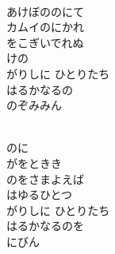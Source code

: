 \documentclass[10pt,b5j]{tarticle} %
\begin{document}
\vspace{1.5em} %
\newcommand{\linespace}{0.5em} %
\newcommand{\blocksize}{0.33\hsize} %
\newcommand{\itemmargin}{3em} %
\begin{enumerate} %
    \setlength{\itemindent}{\itemmargin} %
    \begin{minipage}[c]{\blocksize}
    
        \vspace{\linespace}
        \item~\\
        あけぼののにて\\
        カムイのにかれ\\
        をこぎいでれぬ\\
        けの\\
        がりしに ひとりたち\\
        はるかなるの\\
        のぞみみん
        
        \vspace{\linespace}
        \item~\\
        のに\\
        がをときき\\
        のをさまよえば\\
        はゆるひとつ\\
        がりしに ひとりたち\\
        はるかなるのを\\
        にびん
        
    \end{minipage}
    \begin{minipage}[c]{\blocksize}
        

\end{minipage}
\end{enumerate}
\end{document}
